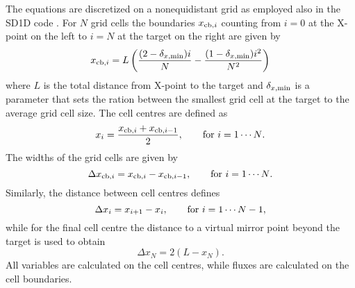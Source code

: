 \documentclass[amsmath,amssymb,a4]{revtex4}
\begin{document}
The equations are discretized on a nonequidistant grid as employed also in the SD1D code \cite{SD1D}. For  $N$ grid cells the boundaries $x_{{\rm cb},i}$ counting from $i = 0$ at the X-point on the left to $i =N$ at the target on the right are given by \cite{SD1D}
\begin{equation}\label{cell_boundaries}
   x_{{\rm cb},i} = L \left( {(2 - \delta_{x,{\rm min}}) i \over N} - {(1 - \delta_{x,{\rm min}}) i^2 \over N^2} \right)
\end{equation}
where $L$ is the total distance from X-point to the target and $\delta_{x,{\rm min}}$ is a parameter that sets the ration between the smallest grid cell at the target to the average grid cell size. The cell centres are defined as
\begin{equation}\label{cell_centres}
    x_i = {x_{{\rm cb},i} + x_{{\rm cb},i-1} \over 2}, \quad\quad\hbox{for $i = 1 \cdots N$}.
\end{equation}
The widths of the grid cells are given by
\begin{equation}\label{cell_width}
    \Delta x_{{\rm cb},i} = x_{{\rm cb},i} - x_{{\rm cb},i-1}, \quad\quad\hbox{for $i = 1 \cdots N$}.
\end{equation}
Similarly, the distance between cell centres defines
\begin{equation}\label{deltax}
    \Delta x_i = x_{i+1} - x_{i}, \quad\quad\hbox{for $i = 1 \cdots N-1$},
\end{equation}
while for the final cell centre the distance to a virtual mirror point beyond the target is used to obtain
\begin{equation}
    \Delta x_N = 2 ( L - x_N ).
\end{equation}
All variables are calculated on the cell centres, while fluxes are calculated on the cell boundaries.
\end{document}
